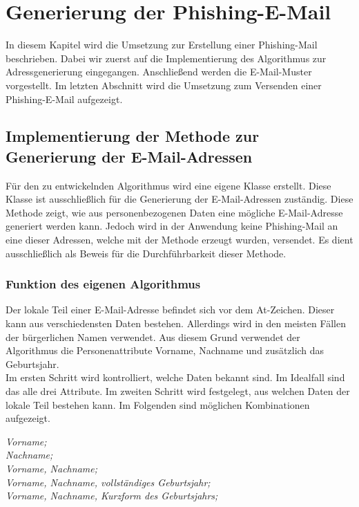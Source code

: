 
\chapter{Generierung der Phishing-E-Mail}  %
\label{cha:ErstellungeinerPhishing-Mail} %
In diesem Kapitel wird die Umsetzung zur Erstellung einer Phishing-Mail beschrieben. Dabei wir zuerst auf die Implementierung des Algorithmus zur Adressgenerierung eingegangen. Anschließend werden die E-Mail-Muster vorgestellt. Im letzten Abschnitt wird die Umsetzung zum Versenden einer Phishing-E-Mail aufgezeigt. 

\section{Implementierung der Methode zur Generierung der E-Mail-Adressen}	
Für den zu entwickelnden Algorithmus wird eine eigene Klasse erstellt. Diese Klasse ist ausschließlich für die Generierung der E-Mail-Adressen zuständig. Diese Methode zeigt, wie aus personenbezogenen Daten eine mögliche E-Mail-Adresse generiert werden kann. Jedoch wird in der Anwendung keine Phishing-Mail an eine dieser Adressen, welche mit der Methode erzeugt wurden, versendet. Es dient ausschließlich als Beweis für die Durchführbarkeit dieser Methode.

	\subsection{Funktion des eigenen Algorithmus}
	Der lokale Teil einer E-Mail-Adresse befindet sich vor dem At-Zeichen. Dieser kann aus verschiedensten Daten bestehen. Allerdings wird in den meisten Fällen der bürgerlichen Namen verwendet. \cite{NameAlsEMail} Aus diesem Grund verwendet der Algorithmus die Personenattribute Vorname, Nachname und zusätzlich das Geburtsjahr.\\
	Im ersten Schritt wird kontrolliert, welche Daten bekannt sind. Im Idealfall sind das alle drei Attribute. Im zweiten Schritt wird festgelegt, aus welchen Daten der lokale Teil bestehen kann. Im Folgenden sind möglichen Kombinationen aufgezeigt.
	
	\textit{Vorname;}\\
	\textit{Nachname;}\\
	\textit{Vorname, Nachname;}\\
	\textit{Vorname, Nachname, vollständiges Geburtsjahr;}\\
	\textit{Vorname, Nachname, Kurzform des Geburtsjahrs;}
	
